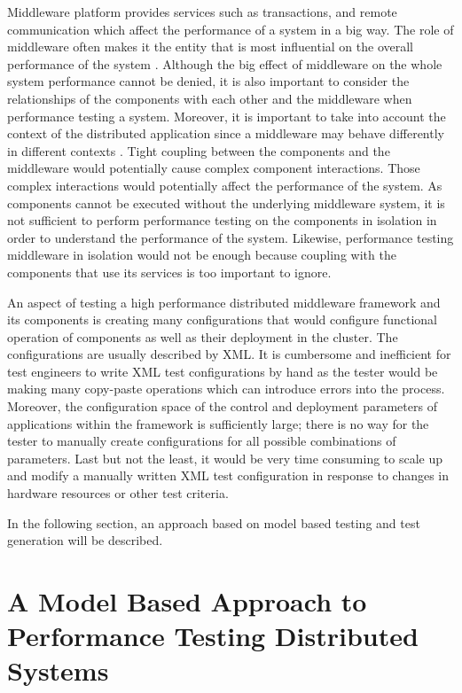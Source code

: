 Middleware platform provides services such as transactions, and remote communication which affect the performance of a system in a big way. The role of middleware often makes it the entity that is most influential on the overall performance of the system \cite{LiuGorton02}. Although the big effect of middleware on the whole system performance cannot be denied, it is also important to consider the relationships of the components with each other and the middleware when performance testing a system. Moreover, it is important to take into account the context of the distributed application since a middleware may behave differently in different contexts \cite{Denaro04, Denaro05}. Tight coupling between the components and the middleware would potentially cause complex component interactions. Those complex interactions would potentially affect the performance of the system. As components cannot be executed without the underlying middleware system, it is not sufficient to perform performance testing on the components in isolation in order to understand the performance of the system. Likewise, performance testing middleware in isolation would not be enough because coupling with the components that use its services is too important to ignore. 

An aspect of testing a high performance distributed middleware framework and its components is creating many configurations that would configure functional operation of components as well as their deployment in the cluster. The configurations are usually described by XML. It is cumbersome and inefficient for test engineers to write XML test configurations by hand as the tester would be making many copy-paste operations which can introduce errors into the process. Moreover, the configuration space of the control and deployment parameters of applications within the framework is sufficiently large; there is no way for the tester to manually create configurations for all possible combinations of parameters. Last but not the least, it would be very time consuming to scale up and modify a manually written XML test configuration in response to changes in hardware resources or other test criteria.

In the following section, an approach based on model based testing and test generation will be described.

\section{A Model Based Approach to Performance Testing Distributed Systems}
\label{Section:TSDML}


